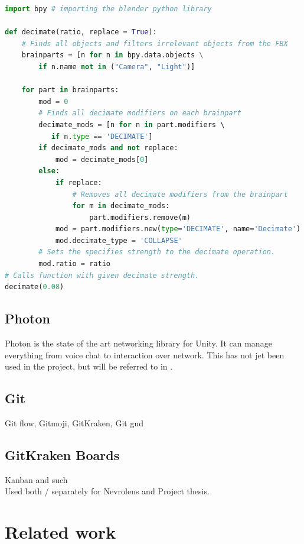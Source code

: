 \begin{lstlisting}[language=python, label={item:blenderscript}, caption={Blender script applying a decimate modifier to all relevant objects in a scene.}]
import bpy # importing the blender python library

def decimate(ratio, replace = True):
    # Finds all objects and filters irrelevant objects from the FBX 
    brainparts = [n for n in bpy.data.objects \
        if n.name not in ("Camera", "Light")]

    for part in brainparts:
        mod = 0
        # Finds all decimate modifiers on each brainpart
        decimate_mods = [n for n in part.modifiers \ 
           if n.type == 'DECIMATE']
        if decimate_mods and not replace:
            mod = decimate_mods[0]
        else:
            if replace: 
                # Removes all decimate modifiers from the brainpart
                for m in decimate_mods:
                    part.modifiers.remove(m)
            mod = part.modifiers.new(type='DECIMATE', name='Decimate')
            mod.decimate_type = 'COLLAPSE'
        # Sets the specifies strength to the decimate operation. 
        mod.ratio = ratio
# Calls function with given decimate strength.
decimate(0.08)
\end{lstlisting}

\subsection*{Photon}\label{chap:photon}
Photon is the state of the art networking library for Unity. It can manage everything from voice chat to interaction over network. This has not jet been used in the project, but will be referred to in . 

\subsection*{Git}
Git flow, Gitmoji, GitKraken, Git gud 

\subsection*{GitKraken Boards}
Kanban and such \\
Used both / separately for Nevrolens and Project thesis.




\section{Related work}

